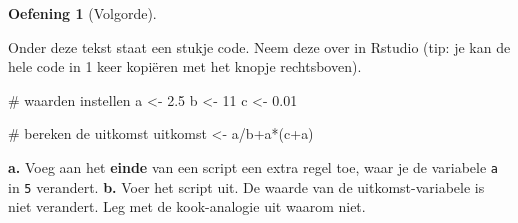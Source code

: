 \documentclass[
  a4paper,
]{scrbook}
\newenvironment{Shaded}{\begin{snugshade}}{\end{snugshade}}
\newcommand{\CommentTok}[1]{\textcolor[rgb]{0.37,0.37,0.37}{#1}}
\newcommand{\DecValTok}[1]{\textcolor[rgb]{0.68,0.00,0.00}{#1}}
\newcommand{\FloatTok}[1]{\textcolor[rgb]{0.68,0.00,0.00}{#1}}
\newcommand{\NormalTok}[1]{\textcolor[rgb]{0.00,0.23,0.31}{#1}}
\newcommand{\OtherTok}[1]{\textcolor[rgb]{0.00,0.23,0.31}{#1}}
\newcommand{\SpecialCharTok}[1]{\textcolor[rgb]{0.37,0.37,0.37}{#1}}
\theoremstyle{definition}
\newtheorem{exercise}{Oefening}[chapter]
\theoremstyle{remark}
\begin{document}
\begin{exercise}[Volgorde]\protect\hypertarget{exr-R-2}{}\label{exr-R-2}

Onder deze tekst staat een stukje code. Neem deze over in Rstudio (tip:
je kan de hele code in 1 keer kopiëren met het knopje rechtsboven).

\begin{Shaded}
\begin{Highlighting}[]
\CommentTok{\# waarden instellen}
\NormalTok{a }\OtherTok{\textless{}{-}} \FloatTok{2.5}
\NormalTok{b }\OtherTok{\textless{}{-}} \DecValTok{11}
\NormalTok{c }\OtherTok{\textless{}{-}} \FloatTok{0.01}

\CommentTok{\# bereken de uitkomst}
\NormalTok{uitkomst }\OtherTok{\textless{}{-}}\NormalTok{ a}\SpecialCharTok{/}\NormalTok{b}\SpecialCharTok{+}\NormalTok{a}\SpecialCharTok{*}\NormalTok{(c}\SpecialCharTok{+}\NormalTok{a)}
\end{Highlighting}
\end{Shaded}

\textbf{a.} Voeg aan het \textbf{einde} van een script een extra regel
toe, waar je de variabele \texttt{a} in \texttt{5} verandert.
\textbf{b.} Voer het script uit. De waarde van de uitkomst-variabele is
niet verandert. Leg met de kook-analogie uit waarom niet.

\end{exercise}
\end{document}
